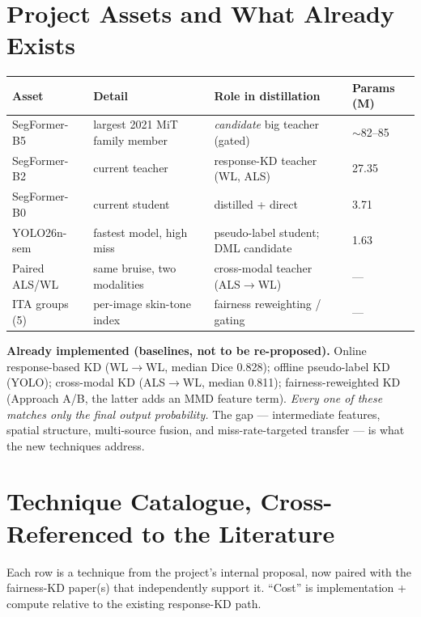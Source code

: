 \documentclass[11pt]{article}
\begin{document}
\section{Project Assets and What Already Exists}

\begin{center}
\small
\begin{tabular}{P{3.1cm} P{4.0cm} P{4.4cm} P{2.0cm}}
\toprule
Asset & Detail & Role in distillation & Params (M) \\
\midrule
SegFormer-B5 & largest 2021 MiT family member & \emph{candidate} big teacher (gated) & $\sim$82--85 \\
SegFormer-B2 & current teacher & response-KD teacher (WL, ALS) & 27.35 \\
SegFormer-B0 & current student & distilled + direct & 3.71 \\
YOLO26n-sem & fastest model, high miss & pseudo-label student; DML candidate & 1.63 \\
Paired ALS/WL & same bruise, two modalities & cross-modal teacher (ALS$\to$WL) & --- \\
ITA groups (5) & per-image skin-tone index & fairness reweighting / gating & --- \\
\bottomrule
\end{tabular}
\end{center}

\textbf{Already implemented (baselines, not to be re-proposed).} Online response-based KD
(WL$\to$WL, median Dice 0.828); offline pseudo-label KD (YOLO); cross-modal KD (ALS$\to$WL,
median 0.811); fairness-reweighted KD (Approach A/B, the latter adds an MMD feature term).
\emph{Every one of these matches only the final output probability.} The gap --- intermediate
features, spatial structure, multi-source fusion, and miss-rate-targeted transfer --- is what
the new techniques address.

\section{Technique Catalogue, Cross-Referenced to the Literature}

Each row is a technique from the project's internal proposal, now paired with the
fairness-KD paper(s) that independently support it. ``Cost'' is implementation + compute
relative to the existing response-KD path.
\end{document}
